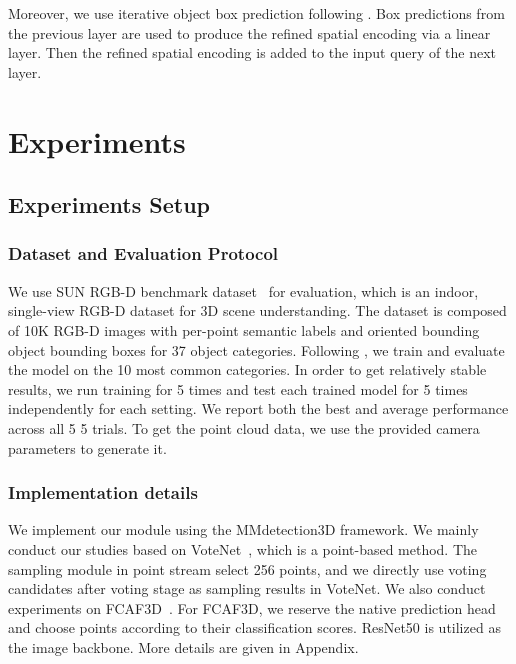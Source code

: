 \documentclass[runningheads]{llncs}
\begin{document}
Moreover, we use iterative object box prediction following \cite{liu2021group}. Box predictions from the previous layer are used to produce the refined spatial encoding via a linear layer. Then the refined spatial encoding is added to the input query of the next layer.

\section{Experiments}

\subsection{Experiments Setup}

\subsubsection{Dataset and Evaluation Protocol}

We use SUN RGB-D benchmark dataset~\cite{sunrgbd} for evaluation, which is an indoor, single-view RGB-D dataset for 3D scene understanding. The dataset is composed of 10K RGB-D images with per-point semantic labels and oriented bounding object bounding boxes for 37 object categories. Following \cite{song2016deep}, we train and evaluate the model on the 10 most common categories. In order to get relatively stable results, we run training for 5 times and test each trained model for 5 times independently for each setting. We report both the best and average performance across all 5  5 trials. To get the point cloud data, we use the provided camera parameters to generate it.

\subsubsection{Implementation details}

We implement our module using the MMdetection3D \cite{mmdet3d2020} framework. We mainly conduct our studies based on VoteNet~\cite{qi2019deep}, which is a point-based method. The sampling module in point stream select 256 points, and we directly use voting candidates after voting stage as sampling results in VoteNet. We also conduct experiments on FCAF3D~\cite{rukhovich2021fcaf3d}. For FCAF3D, we reserve the native prediction head and choose points according to their classification scores. ResNet50 \cite{he2016deep} is utilized as the image backbone. More details are given in Appendix.
\end{document}
